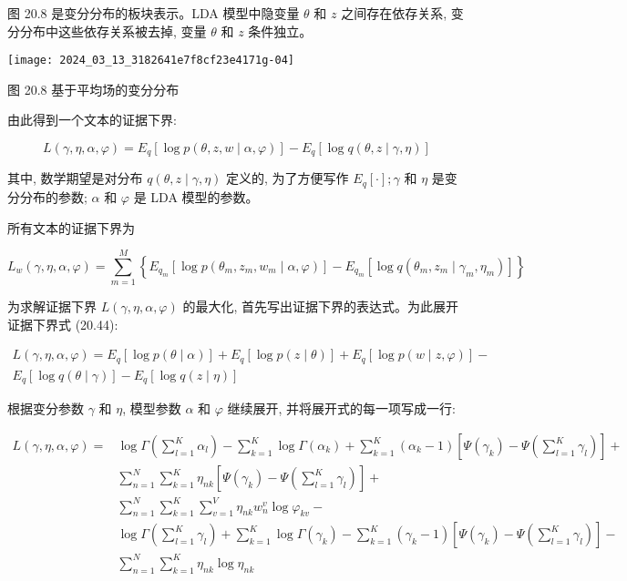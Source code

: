 \documentclass[10pt]{article}
\begin{document}
\begin{CJK*}{UTF8}{bsmi}
图 20.8 是变分分布的板块表示。LDA 模型中隐变量 $\theta$ 和 $z$ 之间存在依存关系, 变分分布中这些依存关系被去掉, 变量 $\theta$ 和 $z$ 条件独立。

\begin{center}
\texttt{[image: 2024\_03\_13\_3182641e7f8cf23e4171g-04]}
\end{center}

图 20.8 基于平均场的变分分布

由此得到一个文本的证据下界:


\begin{equation*}
L(\gamma, \eta, \alpha, \varphi)=E_{q}[\log p(\theta, z, w \mid \alpha, \varphi)]-E_{q}[\log q(\theta, z \mid \gamma, \eta)] \tag{20.44}
\end{equation*}


其中, 数学期望是对分布 $q(\theta, z \mid \gamma, \eta)$ 定义的, 为了方便写作 $E_{q}[\cdot] ; \gamma$ 和 $\eta$ 是变分分布的参数; $\alpha$ 和 $\varphi$ 是 LDA 模型的参数。

所有文本的证据下界为


\begin{equation*}
L_{w}(\gamma, \eta, \alpha, \varphi)=\sum_{m=1}^{M}\left\{E_{q_{m}}\left[\log p\left(\theta_{m}, z_{m}, w_{m} \mid \alpha, \varphi\right)\right]-E_{q_{m}}\left[\log q\left(\theta_{m}, z_{m} \mid \gamma_{m}, \eta_{m}\right)\right]\right\} \tag{20.45}
\end{equation*}


为求解证据下界 $L(\gamma, \eta, \alpha, \varphi)$ 的最大化, 首先写出证据下界的表达式。为此展开证据下界式 (20.44):


\begin{gather*}
L(\gamma, \eta, \alpha, \varphi)=E_{q}[\log p(\theta \mid \alpha)]+E_{q}[\log p(z \mid \theta)]+E_{q}[\log p(w \mid z, \varphi)]- \\
E_{q}[\log q(\theta \mid \gamma)]-E_{q}[\log q(z \mid \eta)] \tag{20.46}
\end{gather*}


根据变分参数 $\gamma$ 和 $\eta$, 模型参数 $\alpha$ 和 $\varphi$ 继续展开, 并将展开式的每一项写成一行:


\begin{align*}
L(\gamma, \eta, \alpha, \varphi)= & \log \Gamma\left(\sum_{l=1}^{K} \alpha_{l}\right)-\sum_{k=1}^{K} \log \Gamma\left(\alpha_{k}\right)+\sum_{k=1}^{K}\left(\alpha_{k}-1\right)\left[\Psi\left(\gamma_{k}\right)-\Psi\left(\sum_{l=1}^{K} \gamma_{l}\right)\right]+ \\
& \sum_{n=1}^{N} \sum_{k=1}^{K} \eta_{n k}\left[\Psi\left(\gamma_{k}\right)-\Psi\left(\sum_{l=1}^{K} \gamma_{l}\right)\right]+ \\
& \sum_{n=1}^{N} \sum_{k=1}^{K} \sum_{v=1}^{V} \eta_{n k} w_{n}^{v} \log \varphi_{k v}- \\
& \log \Gamma\left(\sum_{l=1}^{K} \gamma_{l}\right)+\sum_{k=1}^{K} \log \Gamma\left(\gamma_{k}\right)-\sum_{k=1}^{K}\left(\gamma_{k}-1\right)\left[\Psi\left(\gamma_{k}\right)-\Psi\left(\sum_{l=1}^{K} \gamma_{l}\right)\right]- \\
& \sum_{n=1}^{N} \sum_{k=1}^{K} \eta_{n k} \log \eta_{n k} \tag{20.47}
\end{align*}



\end{CJK*}
\end{document}
